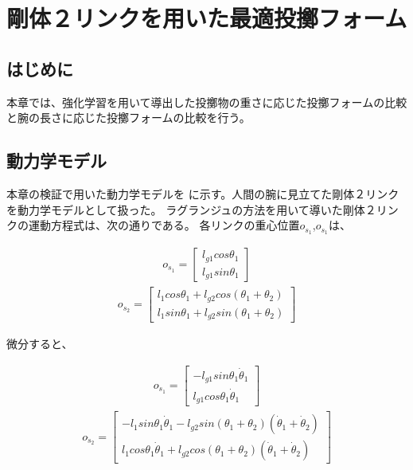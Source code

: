 \chapter[剛体２リンクによる最適投擲シミュレーション]{剛体２リンクを用いた最適投擲フォーム}

\section{はじめに}
本章では、強化学習を用いて導出した投擲物の重さに応じた投擲フォームの比較と腕の長さに応じた投擲フォームの比較を行う。
\section{動力学モデル}
本章の検証で用いた動力学モデルを
に示す。人間の腕に見立てた剛体２リンクを動力学モデルとして扱った。
ラグランジュの方法を用いて導いた剛体２リンクの運動方程式は、次の通りである。
各リンクの重心位置$o_{s_{1}}$,$o_{s_{1}}$は、

\begin{eqnarray}
  o_{s_{1}} = 
              \begin{bmatrix}
              l_{g1}cos\theta_{1}\\
              l_{g1}sin\theta_{1}
              \end{bmatrix}
\end{eqnarray}
\begin{eqnarray}
  o_{s_{2}} = 
              \begin{bmatrix}
              l_{1}cos\theta_{1} + l_{g2}cos(\theta_{1} + \theta_{2})\\
              l_{1}sin\theta_{1} + l_{g2}sin(\theta_{1} + \theta_{2})
              \end{bmatrix}
\end{eqnarray}

微分すると、

\begin{eqnarray}
  o_{\dot{s}_{1}} = 
              \begin{bmatrix}
              -l_{g1}sin\theta_{1}\dot{\theta}_{1}\\
              l_{g1}cos\theta_{1}\dot{\theta}_{1}
              \end{bmatrix}
\end{eqnarray}
\begin{eqnarray}
  o_{\dot{s}_{2}} = 
              \begin{bmatrix}
                -l_{1}sin\theta_{1}\dot{\theta}_{1} - l_{g2}sin(\theta_{1} + \theta_{2})(\dot{\theta}_{1} + \dot{\theta}_{2})\\
                l_{1}cos\theta_{1}\dot{\theta}_{1} + l_{g2}cos(\theta_{1} + \theta_{2})(\dot{\theta}_{1} + \dot{\theta}_{2})
              \end{bmatrix}
\end{eqnarray}

